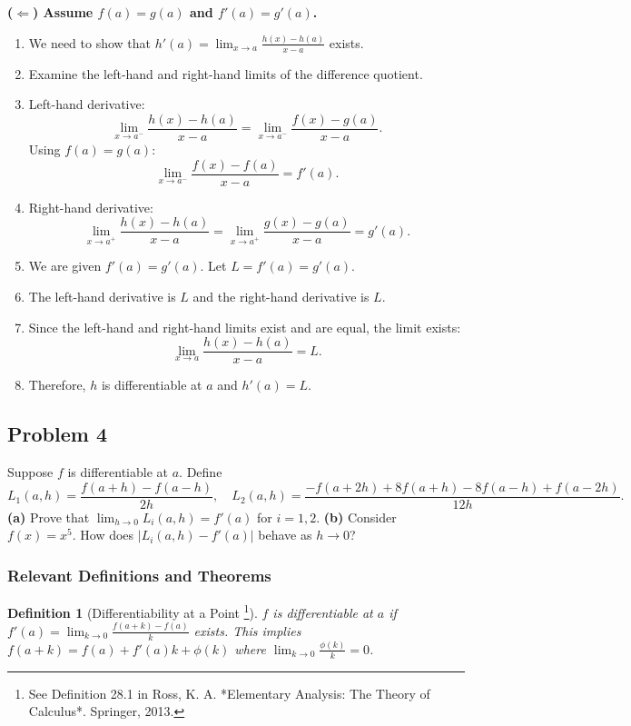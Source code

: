\documentclass{article}
\newtheorem*{definition}{Definition}
\newcommand{\abs}[1]{\left|#1\right|}
\begin{document}
\textbf{($\Leftarrow$) Assume \(f(a) = g(a)\) and \(f'(a) = g'(a)\).}
\begin{enumerate}
    \item We need to show that \(h'(a) = \lim_{x \to a} \frac{h(x) - h(a)}{x - a}\) exists.
    \item Examine the left-hand and right-hand limits of the difference quotient.
    \item Left-hand derivative:
    \[ \lim_{x \to a^-} \frac{h(x) - h(a)}{x - a} = \lim_{x \to a^-} \frac{f(x) - g(a)}{x - a}. \]
    Using \(f(a) = g(a)\):
    \[ \lim_{x \to a^-} \frac{f(x) - f(a)}{x - a} = f'(a). \]
    \item Right-hand derivative:
    \[ \lim_{x \to a^+} \frac{h(x) - h(a)}{x - a} = \lim_{x \to a^+} \frac{g(x) - g(a)}{x - a} = g'(a). \]
    \item We are given \(f'(a) = g'(a)\). Let \(L = f'(a) = g'(a)\).
    \item The left-hand derivative is \(L\) and the right-hand derivative is \(L\).
    \item Since the left-hand and right-hand limits exist and are equal, the limit exists:
    \[ \lim_{x \to a} \frac{h(x) - h(a)}{x - a} = L. \]
    \item Therefore, \(h\) is differentiable at \(a\) and \(h'(a) = L\).
\end{enumerate}

\hrulefill

\subsection*{Problem 4}

Suppose \(f\) is differentiable at \(a\). Define
\[ L_1(a,h) = \frac{f(a+h)-f(a-h)}{2h}, \quad L_2(a,h) = \frac{-f(a+2h)+8f(a+h)-8f(a-h)+f(a-2h)}{12h}. \]
\textbf{(a)} Prove that \(\lim_{h\to 0} L_i(a,h)=f'(a)\) for \(i=1,2\).
\textbf{(b)} Consider \(f(x)=x^5\). How does \(\abs{L_i(a,h)-f'(a)}\) behave as \(h \to 0\)?

\subsubsection*{Relevant Definitions and Theorems}

\begin{definition}[Differentiability at a Point \footnote{See Definition 28.1 in Ross, K. A. *Elementary Analysis: The Theory of Calculus*. Springer, 2013.}]
\(f\) is differentiable at \(a\) if \(f'(a) = \lim_{k \to 0} \frac{f(a+k) - f(a)}{k}\) exists.
This implies \(f(a+k) = f(a) + f'(a)k + \phi(k)\) where \(\lim_{k \to 0} \frac{\phi(k)}{k} = 0\).
\end{definition}
\end{document}
